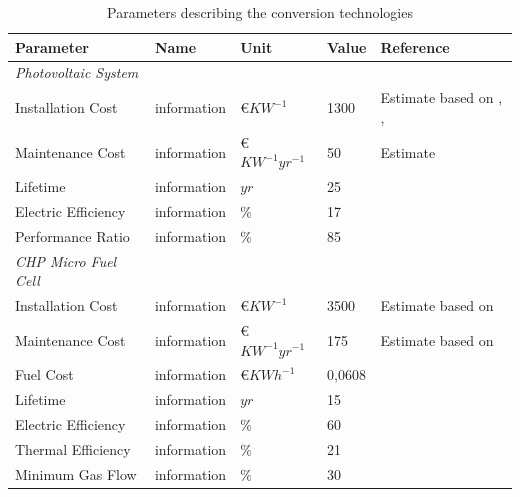 \documentclass[
	11pt,								%
	DIV10,								%
	a4paper,         					%
	oneside,							%
	headheight=20pt,					%
	footheight=20pt,					%
    parskip=full,						%
    listof=totoc,						%
	bibliography=totoc,					%
	index=totoc,						%
]{scrartcl}
\begin{document}
\begin{table}[H]
	\centering
	\caption{Parameters describing the conversion technologies}
	\begin{tabular}{lllll}
		\hline
		\textbf{Parameter}			& \textbf{Name}			& \textbf{Unit}			& \textbf{Value}	&\textbf{Reference}     \\ \hline
		\textit{Photovoltaic System} & & & &\\
		Installation Cost           & information     		& \euro $KW^{-1}$  		& 1300				& Estimate based on \cite{wirthAktuelleFaktenZur2018}, \cite{SolarmoduleEBay2018}, \cite{ModulePriceIndex2018}   \\
		Maintenance Cost            & information     		& \euro $KW^{-1}yr^{-1}$& 50				& Estimate \\
		Lifetime                    & information     		& $yr$  				& 25 				& \cite{wirthAktuelleFaktenZur2018}   \\
		Electric Efficiency         & information     		& $\%$  				& 17				& \cite{wirthAktuelleFaktenZur2018}   \\
		Performance Ratio           & information     		& $\%$  				& 85				& \cite{wirthAktuelleFaktenZur2018}   \\
		\textit{CHP Micro Fuel Cell} & & & &\\
		Installation Cost           & information     		& \euro $KW^{-1}$  		& 3500 				& Estimate based on \cite{LAUINGER201624}    \\
		Maintenance Cost            & information     		& \euro $KW^{-1}yr^{-1}$& 175				& Estimate based on \cite{LAUINGER201624}   \\
		Fuel	 Cost           			& information     		& \euro $KWh^{-1}$   	& 0,0608			& \cite{NaturalGasPrices2018}   \\
		Lifetime                    & information     		& $yr$  				& 15 				& \cite{LAUINGER201624}    \\
		Electric Efficiency         & information     		& $\%$  				& 60				& \cite{BlueGENWorldsMost2018}   \\
		Thermal Efficiency			& information     		& $\%$  				& 21				& \cite{BlueGENWorldsMost2018}   \\
		Minimum Gas Flow    			& information     		& $\%$ 		 			& 30				& \cite{LAUINGER201624}   \\
		\hline
	\end{tabular}
\end{table}
\end{document}
